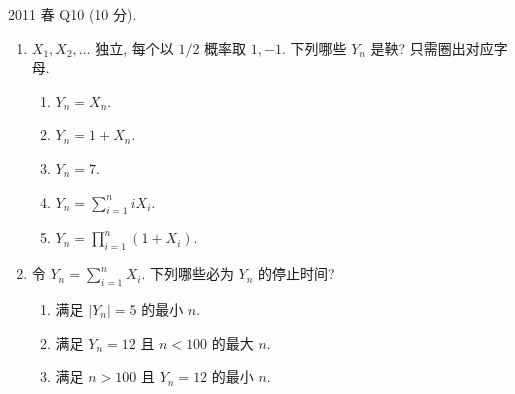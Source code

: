 \begin{exercise}\label{ex:fe2011q10}
2011 春 Q10 (10 分).
\begin{enumerate}[label=\arabic*.]
\item $X_1,X_2,\ldots$ 独立, 每个以 $1/2$ 概率取 $1,-1$. 下列哪些 $Y_n$ 是鞅? 只需圈出对应字母.
\begin{enumerate}[label=(\alph*)]
\item\label{ex:fe2011q10-1-a} $Y_n=X_n$.
\item\label{ex:fe2011q10-1-b} $Y_n=1+X_n$.
\item\label{ex:fe2011q10-1-c} $Y_n=7$.
\item\label{ex:fe2011q10-1-d} $Y_n=\sum_{i=1}^n iX_i$.
\item\label{ex:fe2011q10-1-e} $Y_n=\prod_{i=1}^n(1+X_i)$.
\end{enumerate}
\item 令 $Y_n=\sum_{i=1}^nX_i$. 下列哪些必为 $Y_n$ 的停止时间?
\begin{enumerate}[label=(\alph*)]
\item\label{ex:fe2011q10-2-a} 满足 $|Y_n|=5$ 的最小 $n$.
\item\label{ex:fe2011q10-2-b} 满足 $Y_n=12$ 且 $n<100$ 的最大 $n$.
\item\label{ex:fe2011q10-2-c} 满足 $n>100$ 且 $Y_n=12$ 的最小 $n$.
\end{enumerate}
\end{enumerate}
\end{exercise}
